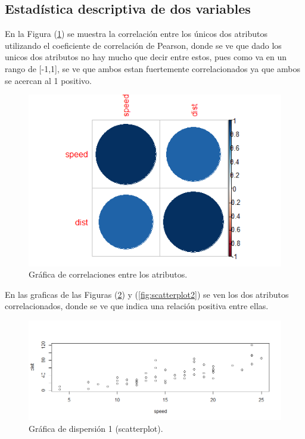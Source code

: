 \documentclass[12pt,a4paper]{article}
\begin{document}
\newpage
\subsection{Estadística descriptiva de dos variables} \label{subsec:estadistdescrpdos}

En la Figura (\ref{fig:correlations}) se muestra la correlación entre los únicos dos atributos utilizando el coeficiente de correlación de Pearson, donde se ve que dado los unicos dos atributos no hay mucho que decir entre estos, pues como va en un rango de [-1,1], se ve que ambos estan fuertemente correlacionados ya que ambos se acercan al 1 positivo.

\begin{figure}
\centering
\includegraphics[scale=0.5]{correlations}
\caption{Gráfica de correlaciones entre los atributos.}
\label{fig:correlations}
\end{figure}

En las graficas de las Figuras (\ref{fig:scatterplot1}) y (\ref{fig:scatterplot2}) se ven los dos atributos correlacionados, donde se ve que indica una relación positiva entre ellas.

\begin{figure}
\centering
\includegraphics[scale=0.5]{scatterPlot}
\caption{Gráfica de dispersión 1 (scatterplot).}
\label{fig:scatterplot1}
\end{figure}
\end{document}
